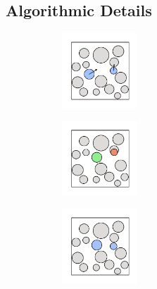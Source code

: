 \subsection{Algorithmic Details} 

\begin{figure}[bt]
     \centering
     
     \begin{subfigure}[b]{0.25\textwidth}
         \centering
         \includegraphics[width=2.8cm]{./figures/methods/mc_move_a.pdf}
         \caption{}
         \label{fig:hardmc1}
     \end{subfigure}
     \begin{subfigure}[b]{0.25\textwidth}
         \centering
         \includegraphics[width=2.8cm]{./figures/methods/mc_move_b.pdf}
         \caption{}
         \label{fig:hardmc2}
     \end{subfigure}
     \begin{subfigure}[b]{0.25\textwidth}
         \centering
         \includegraphics[width=2.8cm]{./figures/methods/mc_move_c.pdf}
         \caption{}
         \label{fig:hardmc3}
     \end{subfigure}
     

\end{figure}
